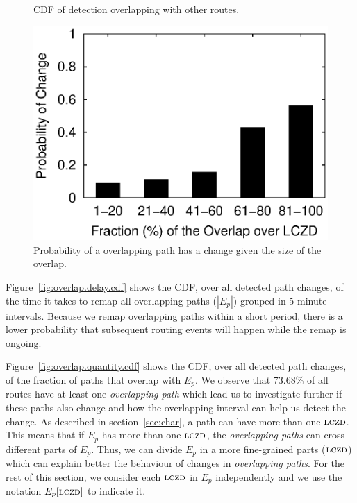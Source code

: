 \begin{figure}
\begin{minipage}{0.32\textwidth}
\caption{CDF of detection overlapping with other routes.}
\label{fig:overlap.quantity.cdf}
\end{minipage}
%
\hfill
\begin{minipage}{0.32\textwidth}
\includegraphics[width=1.05\columnwidth]{figs/patching/probchange/probchange.eps}
\caption{Probability of a overlapping path has a change given the size of the overlap.}
\label{fig:overlap.change.prob}
\end{minipage}
\end{figure}


Figure~\ref{fig:overlap.delay.cdf} shows the CDF, over all detected
path changes, of the time it takes to remap all
overlapping paths ($|E_p|$) grouped in 5-minute intervals.  
Because we remap overlapping paths within
a short period, there is a lower probability that subsequent routing
events will happen while the remap is ongoing.

Figure~\ref{fig:overlap.quantity.cdf} shows the CDF, over all
detected path changes, of the fraction of paths that overlap with $E_p$.  
We observe that 73.68\% of all routes have at least one 
\emph{overlapping path} which lead us to investigate further if these
paths also change and how the overlapping interval can help us detect the change.
As described in section~\ref{sec:char}, a path can have more than one
$\mathrm{\textsc{lczd}}$. This means that if $E_p$ has more than one $\mathrm{\textsc{lczd}}$, the \emph{overlapping
paths} can cross different parts of $E_p$. Thus, we can divide $E_p$ in a more
fine-grained parts ($\mathrm{\textsc{lczd}}$) which can explain better the behaviour of changes in
\emph{overlapping paths}. For the rest of this section, we
consider each $\mathrm{\textsc{lczd}}$ in $E_p$ independently and we use the notation $E_p[\mathrm{\textsc{lczd}}]$ 
to indicate it. 

